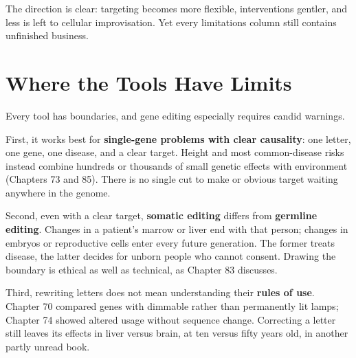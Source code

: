 The direction is clear: targeting becomes more flexible, interventions gentler, and less is left to cellular improvisation. Yet every limitations column still contains unfinished business.

\section{Where the Tools Have Limits}

Every tool has boundaries, and gene editing especially requires candid warnings.

First, it works best for \textbf{single-gene problems with clear causality}: one letter, one gene, one disease, and a clear target. Height and most common-disease risks instead combine hundreds or thousands of small genetic effects with environment (Chapters 73 and 85). There is no single cut to make or obvious target waiting anywhere in the genome.

Second, even with a clear target, \textbf{somatic editing} differs from \textbf{germline editing}. Changes in a patient's marrow or liver end with that person; changes in embryos or reproductive cells enter every future generation. The former treats disease, the latter decides for unborn people who cannot consent. Drawing the boundary is ethical as well as technical, as Chapter 83 discusses.

Third, rewriting letters does not mean understanding their \textbf{rules of use}. Chapter 70 compared genes with dimmable rather than permanently lit lamps; Chapter 74 showed altered usage without sequence change. Correcting a letter still leaves its effects in liver versus brain, at ten versus fifty years old, in another partly unread book.

